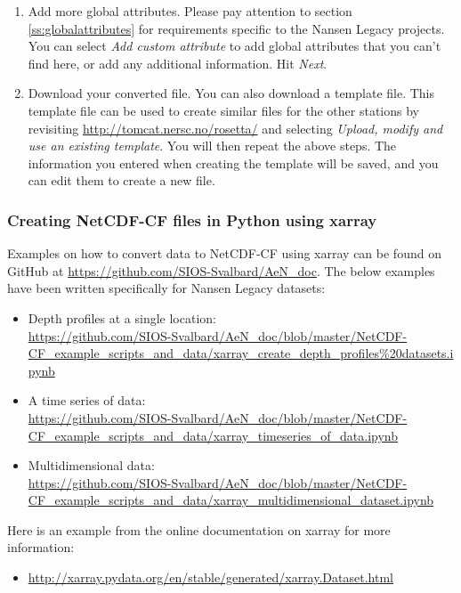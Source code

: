 \documentclass[a4paper,english, 11pt]{article}
\begin{document}
\begin{enumerate}
\item Add more global attributes. Please pay attention to section \ref{ss:globalattributes} for requirements specific to the Nansen Legacy projects. You can select \textit{Add custom attribute} to add global attributes that you can't find here, or add any additional information. Hit \textit{Next}.
\item Download your converted file. You can also download a template file. This template file can be used to create similar files for the other stations by revisiting \url{http://tomcat.nersc.no/rosetta/} and selecting \textit{Upload, modify and use an existing template}. You will then repeat the above steps. The information you entered when creating the template will be saved, and you can edit them to create a new file.
\end{enumerate}

\subsubsection{Creating NetCDF-CF files in Python using xarray}
\label{ss:xarray}

Examples on how to convert data to NetCDF-CF using xarray can be found on GitHub at \href{https://github.com/SIOS-Svalbard/AeN_doc}{https://github.com/SIOS-Svalbard/AeN\_doc}. The below examples have been written specifically for Nansen Legacy datasets:

\begin{itemize}
\item{Depth profiles at a single location: \\ 
\url{https://github.com/SIOS-Svalbard/AeN_doc/blob/master/NetCDF-CF_example_scripts_and_data/xarray_create_depth_profiles\%20datasets.ipynb}}
\item{A time series of data: \\ 
\url{https://github.com/SIOS-Svalbard/AeN_doc/blob/master/NetCDF-CF_example_scripts_and_data/xarray_timeseries_of_data.ipynb}} 
\item{Multidimensional data: \\ 
\url{https://github.com/SIOS-Svalbard/AeN_doc/blob/master/NetCDF-CF_example_scripts_and_data/xarray_multidimensional_dataset.ipynb}}
\end{itemize}

Here is an example from the online documentation on xarray for more information:
\begin{itemize}
\item \url{http://xarray.pydata.org/en/stable/generated/xarray.Dataset.html}
\end{itemize}
\end{document}

